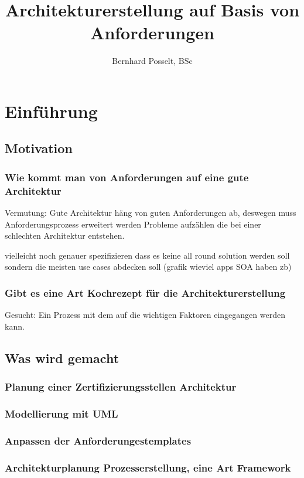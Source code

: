 \documentclass[Master,MSE,german]{twbook}
\title{Architekturerstellung auf Basis von Anforderungen}
\author{Bernhard Posselt, BSc}
\begin{document}
\maketitle

%
%

\chapter{Einführung}

\section{Motivation}
\subsection{Wie kommt man von Anforderungen auf eine gute Architektur}
Vermutung: Gute Architektur häng von guten Anforderungen ab, deswegen muss Anforderungsprozess erweitert werden
Probleme aufzählen die bei einer schlechten Architektur entstehen.

vielleicht noch genauer spezifizieren dass es keine all round solution werden soll sondern die meisten use cases abdecken soll (grafik wieviel apps SOA haben zb)

\subsection{Gibt es eine Art Kochrezept für die Architekturerstellung}
Gesucht: Ein Prozess mit dem auf die wichtigen Faktoren eingegangen werden kann.

\section{Was wird gemacht}
\subsection{Planung einer Zertifizierungsstellen Architektur}
\subsection{Modellierung mit UML}
\subsection{Anpassen der Anforderungestemplates}
\subsection{Architekturplanung Prozesserstellung, eine Art Framework}
\end{document}
